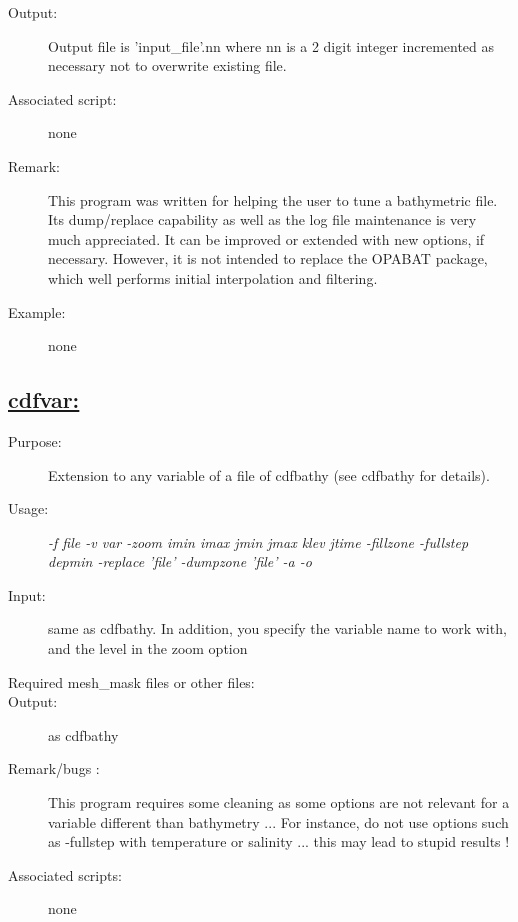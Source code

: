\documentclass[a4paper,11pt]{article}
\begin{document}
\begin{description}
\item[Output:] Output file is 'input\_file'.nn where nn is a 2 digit integer incremented as necessary not to overwrite 
      existing file.
\item[Associated script:] none
\item[Remark:] This program was written for helping the user to tune a bathymetric file. Its dump/replace capability as well
     as the log file maintenance is very much appreciated.  It can be improved or extended with new options, if necessary. 
     However, it is not intended to replace the OPABAT package, which well performs initial interpolation and filtering.
\item[Example:] none
\end{description}

\newpage
\subsection*{\underline{cdfvar:}}
\begin{description}
\item[Purpose:] Extension to any variable of a file of cdfbathy (see cdfbathy for details).
\item[Usage:] {\em -f file -v var -zoom imin imax jmin jmax klev jtime -fillzone -fullstep depmin
      -replace 'file' -dumpzone 'file' -a -o}
\item[Input:] same as cdfbathy. In addition, you specify the variable name to work with, and the level in the zoom option
\item[Required mesh\_mask files or other files:]
\item[Output:]  as cdfbathy
\item[Remark/bugs :] This program requires some cleaning as some options are not relevant for a variable different than bathymetry ... For instance, do not use options such as -fullstep with temperature or salinity ... this may lead to stupid results !
\item[Associated scripts:] none
\end{description}

\newpage
\end{document}
